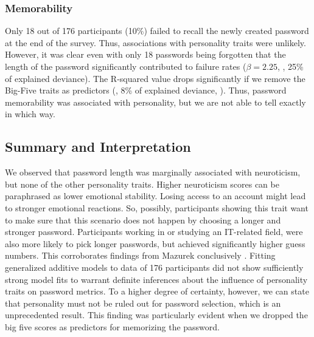 \subsubsection{Memorability}
Only 18 out of 176 participants (10\%) failed to recall the newly created password at the end of the survey. Thus, associations with personality traits were unlikely. However, it was clear even with only 18 passwords being forgotten that the length of the password significantly contributed to failure rates ($\beta=2.25$, , 25\% of explained deviance). The R-squared value drops significantly if we remove the Big-Five traits as predictors (, 8\% of explained deviance, ). Thus, password memorability was associated with personality, but we are not able to tell exactly in which way. 


\subsection{Summary and Interpretation}
We observed that password length was marginally associated with neuroticism, but none of the other personality traits. Higher neuroticism scores can be paraphrased as lower emotional stability. Losing access to an account might lead to stronger emotional reactions. So, possibly, participants showing this trait want to make sure that this scenario does not happen by choosing a longer and stronger password. Participants working in or studying an IT-related field, were also more likely to pick longer passwords, but achieved significantly higher guess numbers. This corroborates findings from Mazurek \etal conclusively \cite{Mazurek2013Measuring}. Fitting generalized additive models to data of 176 participants did not show sufficiently strong model fits to warrant definite inferences about the influence of personality traits on password metrics. To a higher degree of certainty, however, we can state that personality must not be ruled out for password selection, which is an unprecedented result. This finding was particularly evident when we dropped the big five scores as predictors for memorizing the password. 

